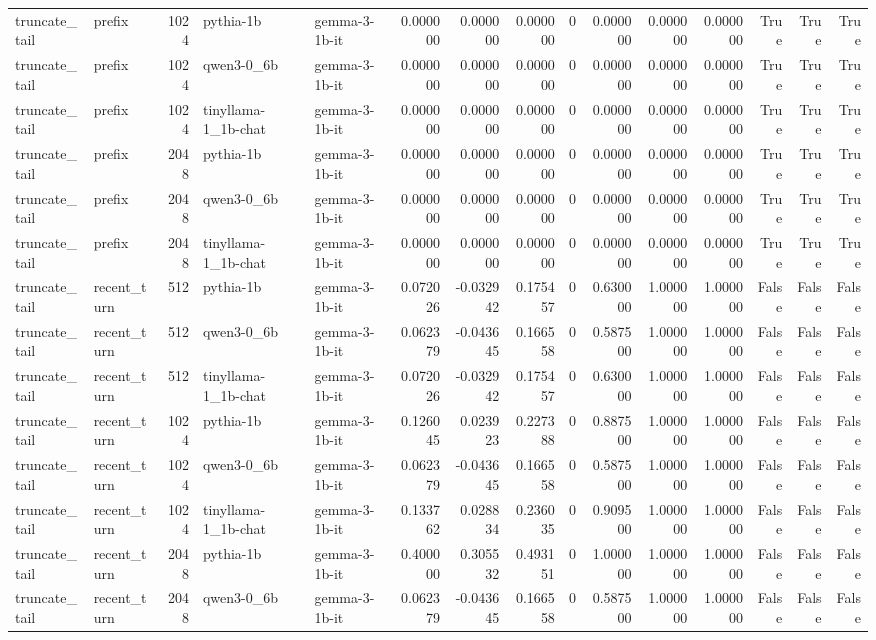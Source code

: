 \begin{tabular}{llrllrrrrrrrrrr}
truncate_tail & prefix & 1024 & pythia-1b & gemma-3-1b-it & 0.000000 & 0.000000 & 0.000000 & 0 & 0.000000 & 0.000000 & 0.000000 & True & True & True \\
truncate_tail & prefix & 1024 & qwen3-0_6b & gemma-3-1b-it & 0.000000 & 0.000000 & 0.000000 & 0 & 0.000000 & 0.000000 & 0.000000 & True & True & True \\
truncate_tail & prefix & 1024 & tinyllama-1_1b-chat & gemma-3-1b-it & 0.000000 & 0.000000 & 0.000000 & 0 & 0.000000 & 0.000000 & 0.000000 & True & True & True \\
truncate_tail & prefix & 2048 & pythia-1b & gemma-3-1b-it & 0.000000 & 0.000000 & 0.000000 & 0 & 0.000000 & 0.000000 & 0.000000 & True & True & True \\
truncate_tail & prefix & 2048 & qwen3-0_6b & gemma-3-1b-it & 0.000000 & 0.000000 & 0.000000 & 0 & 0.000000 & 0.000000 & 0.000000 & True & True & True \\
truncate_tail & prefix & 2048 & tinyllama-1_1b-chat & gemma-3-1b-it & 0.000000 & 0.000000 & 0.000000 & 0 & 0.000000 & 0.000000 & 0.000000 & True & True & True \\
truncate_tail & recent_turn & 512 & pythia-1b & gemma-3-1b-it & 0.072026 & -0.032942 & 0.175457 & 0 & 0.630000 & 1.000000 & 1.000000 & False & False & False \\
truncate_tail & recent_turn & 512 & qwen3-0_6b & gemma-3-1b-it & 0.062379 & -0.043645 & 0.166558 & 0 & 0.587500 & 1.000000 & 1.000000 & False & False & False \\
truncate_tail & recent_turn & 512 & tinyllama-1_1b-chat & gemma-3-1b-it & 0.072026 & -0.032942 & 0.175457 & 0 & 0.630000 & 1.000000 & 1.000000 & False & False & False \\
truncate_tail & recent_turn & 1024 & pythia-1b & gemma-3-1b-it & 0.126045 & 0.023923 & 0.227388 & 0 & 0.887500 & 1.000000 & 1.000000 & False & False & False \\
truncate_tail & recent_turn & 1024 & qwen3-0_6b & gemma-3-1b-it & 0.062379 & -0.043645 & 0.166558 & 0 & 0.587500 & 1.000000 & 1.000000 & False & False & False \\
truncate_tail & recent_turn & 1024 & tinyllama-1_1b-chat & gemma-3-1b-it & 0.133762 & 0.028834 & 0.236035 & 0 & 0.909500 & 1.000000 & 1.000000 & False & False & False \\
truncate_tail & recent_turn & 2048 & pythia-1b & gemma-3-1b-it & 0.400000 & 0.305532 & 0.493151 & 0 & 1.000000 & 1.000000 & 1.000000 & False & False & False \\
truncate_tail & recent_turn & 2048 & qwen3-0_6b & gemma-3-1b-it & 0.062379 & -0.043645 & 0.166558 & 0 & 0.587500 & 1.000000 & 1.000000 & False & False & False \\

\end{tabular}
